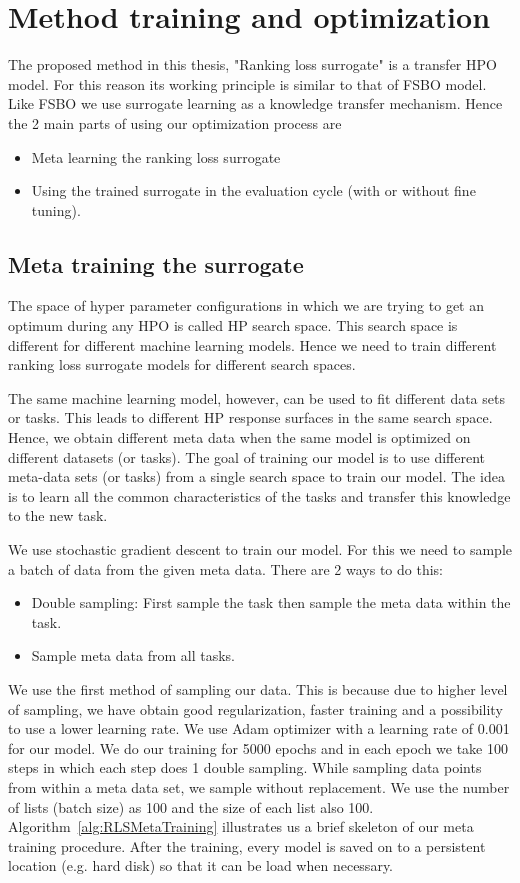 \documentclass[12pt, twoside, ngerman]{report}
\begin{document}
\section{Method training and optimization}

The proposed method in this thesis, "Ranking loss surrogate" is a transfer HPO model.
For this reason its working principle is similar to that of FSBO model.
Like FSBO we use surrogate learning as a knowledge transfer mechanism.
Hence the 2 main parts of using our optimization process are
\begin{itemize}
\item Meta learning the ranking loss surrogate
\item Using the trained surrogate in the evaluation cycle (with or without fine tuning).
\end{itemize}

\subsection{Meta training the surrogate}\label{sec:rlmetatraining}

The space of hyper parameter configurations in which we are trying to get an optimum during any HPO is called HP search space.
This search space is different for different machine learning models.
Hence we need to train different ranking loss surrogate models for different search spaces.

The same machine learning model,  however,  can be used to fit different data sets or tasks.
This leads to different HP response surfaces in the same search space.
Hence,  we obtain different meta data when the same model is optimized on different datasets (or tasks).
The goal of training our model is to use different meta-data sets (or tasks) from a single search space to train our model.
The idea is to learn all the common characteristics of the tasks and transfer this knowledge to the new task.

We use stochastic gradient descent to train our model.
For this we need to sample a batch of data from the given meta data.
There are 2 ways to do this:
\begin{itemize}
\item Double sampling: First sample the task then sample the meta data within the task.
\item Sample meta data from all tasks.
\end{itemize}

We use the first method of sampling our data.
This is because due to higher level of sampling,  we have obtain good regularization,
faster training and a possibility to use a lower learning rate.
We use Adam optimizer with a learning rate of 0.001 for our model.
We do our training for 5000 epochs and in each epoch we take 100 steps in which each step does 1 double sampling.
While sampling data points from within a meta data set, we sample without replacement.
We use the number of lists (batch size) as 100 and the size of each list also 100.
Algorithm~\ref{alg:RLSMetaTraining} illustrates us a brief skeleton of our meta training procedure.
After the training,  every model is saved on to a persistent location (e.g. hard disk) so that it can be load when necessary.
\end{document}

